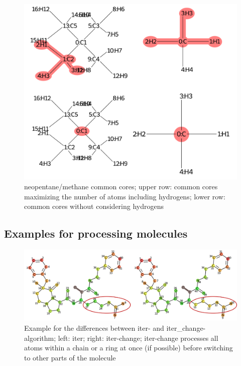 \begin{figure}
	\includegraphics[scale=1.0]{neopentan}
	
	\caption{neopentane/methane common cores; upper row: common cores maximizing the number of atoms including hydrogens; lower row: common cores without considering hydrogens }
		\label{fig:neopentan}
\end{figure}



\subsection{Examples for processing molecules}

\begin{figure}
\includegraphics[scale=0.5]{iter_iter_change_1a5g_1}

\caption{Example for the differences between iter- and iter\_change-algorithm;
left: iter; right: iter-change; iter-change processes all atoms within
a chain or a ring at once (if possible) before switching to other
parts of the molecule}
\end{figure}

